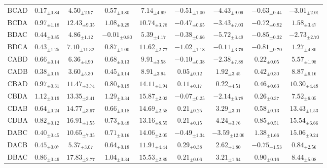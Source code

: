 \begin{table}[!t]
\begin{tabular*}{\textwidth}{@{\extracolsep{\fill}}lcccccccc}
BCAD & $0.17_{\pm0.84}$ & $4.50_{\pm2.97}$ & $0.57_{\pm0.80}$ & $7.14_{\pm4.99}$ & $-0.51_{\pm1.00}$ & $-4.43_{\pm9.09}$ & $-0.63_{\pm0.44}$ & $-3.01_{\pm2.01}$ \\
BCDA & $0.97_{\pm1.18}$ & $12.43_{\pm9.35}$ & $1.08_{\pm0.29}$ & $10.74_{\pm3.78}$ & $-0.47_{\pm0.65}$ & $-3.43_{\pm7.03}$ & $-0.72_{\pm0.92}$ & $1.58_{\pm3.47}$ \\
BDAC & $0.44_{\pm0.85}$ & $4.86_{\pm1.12}$ & $-0.01_{\pm0.80}$ & $5.39_{\pm4.17}$ & $-0.38_{\pm0.66}$ & $-5.72_{\pm3.49}$ & $-0.85_{\pm0.32}$ & $-2.73_{\pm2.70}$ \\
BDCA & $0.43_{\pm1.25}$ & $7.10_{\pm11.32}$ & $0.87_{\pm1.00}$ & $11.62_{\pm2.77}$ & $-1.02_{\pm1.18}$ & $-0.11_{\pm3.79}$ & $-0.81_{\pm0.70}$ & $1.27_{\pm4.80}$ \\
CABD & $0.66_{\pm0.14}$ & $6.36_{\pm4.90}$ & $0.68_{\pm0.13}$ & $9.91_{\pm3.58}$ & {\boldmath$-0.10_{\pm0.38}$} & {\boldmath$-2.38_{\pm7.88}$} & $0.22_{\pm0.05}$ & $5.57_{\pm1.98}$ \\
CADB & $0.38_{\pm0.15}$ & $3.60_{\pm5.30}$ & $0.45_{\pm0.14}$ & $8.91_{\pm3.94}$ & {\boldmath$0.05_{\pm0.12}$} & $1.92_{\pm3.45}$ & $0.42_{\pm0.30}$ & $8.87_{\pm6.16}$ \\
CBAD & $0.97_{\pm0.31}$ & $11.47_{\pm3.74}$ & $0.80_{\pm0.19}$ & $14.11_{\pm1.94}$ & $0.11_{\pm0.17}$ & {\boldmath$0.22_{\pm4.51}$} & $0.46_{\pm0.63}$ & $10.30_{\pm4.48}$ \\
CBDA & $1.12_{\pm0.19}$ & $13.35_{\pm3.41}$ & $1.29_{\pm0.34}$ & $15.87_{\pm2.03}$ & {\boldmath$-0.07_{\pm0.25}$} & {\boldmath$-2.14_{\pm6.78}$} & $0.26_{\pm0.37}$ & $7.52_{\pm6.05}$ \\
CDAB & $0.64_{\pm0.24}$ & $14.77_{\pm3.67}$ & $0.66_{\pm0.18}$ & $14.69_{\pm2.58}$ & {\boldmath$0.21_{\pm0.25}$} & {\boldmath$3.29_{\pm3.01}$} & $0.58_{\pm0.13}$ & $13.43_{\pm1.53}$ \\
CDBA & $0.82_{\pm0.12}$ & $16.91_{\pm1.55}$ & $0.73_{\pm0.48}$ & $13.16_{\pm8.55}$ & {\boldmath$0.21_{\pm0.15}$} & {\boldmath$4.24_{\pm3.76}$} & $0.85_{\pm0.51}$ & $15.54_{\pm6.66}$ \\
DABC & $0.40_{\pm0.45}$ & $10.65_{\pm7.35}$ & $0.71_{\pm0.16}$ & $14.06_{\pm2.05}$ & $-0.49_{\pm1.34}$ & {\boldmath$-3.59_{\pm12.00}$} & $1.38_{\pm1.66}$ & $15.06_{\pm9.24}$ \\
DACB & $0.45_{\pm0.07}$ & $5.37_{\pm3.07}$ & $0.64_{\pm0.18}$ & $11.91_{\pm4.44}$ & $0.29_{\pm0.38}$ & $2.62_{\pm1.80}$ & $-0.75_{\pm1.53}$ & $0.84_{\pm2.56}$ \\
DBAC & $0.86_{\pm0.49}$ & $17.83_{\pm2.77}$ & $1.04_{\pm0.34}$ & $15.53_{\pm2.89}$ & {\boldmath$0.21_{\pm0.06}$} & {\boldmath$3.21_{\pm1.64}$} & $0.90_{\pm0.16}$ & $8.44_{\pm5.08}$ \\

\end{tabular*}
\end{table}

